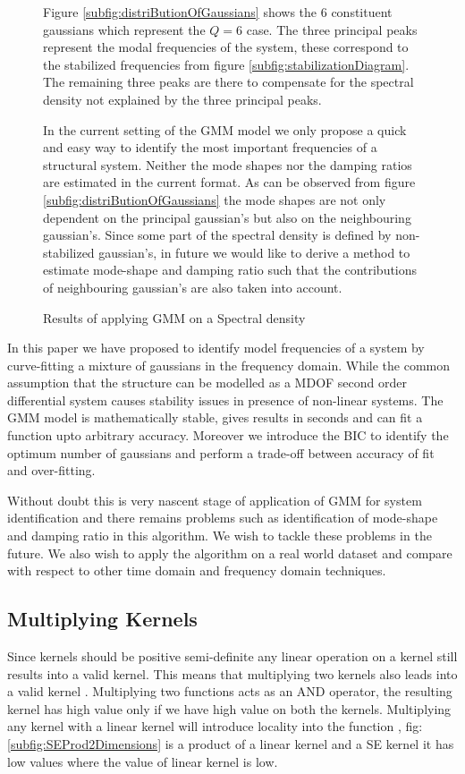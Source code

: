 \begin{figure}[!ht]
Figure \ref{subfig:distriButionOfGaussians} shows the $6$ constituent gaussians which represent the $Q=6$ case. The three principal peaks represent the modal frequencies of the system, these correspond to the stabilized frequencies from figure \ref{subfig:stabilizationDiagram}. The remaining three peaks are there to compensate for the spectral density not explained by the three principal peaks. 

In the current setting of the GMM model we only propose a quick and easy way to identify the most important frequencies of a structural system. Neither the mode shapes nor the damping ratios are estimated in the current format. As can be observed from figure \ref{subfig:distriButionOfGaussians} the mode shapes are not only dependent on the principal gaussian's but also on the neighbouring gaussian's. Since some part of the spectral density is defined by non-stabilized gaussian's, in future we would like to derive a method to estimate mode-shape and damping ratio such that the contributions of neighbouring gaussian's are also taken into account.
  
  \caption{Results of applying GMM on a Spectral density}
\end{figure}

In this paper we have proposed to identify model frequencies of a system by curve-fitting a mixture of gaussians in the frequency domain. While the common assumption that the structure can be modelled as a MDOF second order differential system causes stability issues in presence of non-linear systems. The GMM model is mathematically stable, gives results in seconds and can fit a function upto arbitrary accuracy. Moreover we introduce the BIC to identify the optimum number of gaussians and perform a trade-off between accuracy of fit and over-fitting. 

Without doubt this is very nascent stage of application of GMM for system identification and there remains problems such as identification of mode-shape and damping ratio in this algorithm. We wish to tackle these problems in the future. We also wish to apply the algorithm on a real world dataset and compare with respect to other time domain and frequency domain techniques.


\subsection{Multiplying Kernels} \label{subsec:structureKernelsMultiplyingKernels}
Since kernels should be positive semi-definite any linear operation on a kernel still results into a valid kernel. This means that multiplying two kernels also leads into a valid kernel \cite{bishop2006pattern} \cite{mackay2003information}. Multiplying two functions acts as an AND operator, the resulting kernel has high value only if we have high value on both the kernels. Multiplying any kernel with a linear kernel will introduce locality into the function , fig: \ref{subfig:SEProd2Dimensions} is a product of a linear kernel and a SE kernel it has low values where the value of linear kernel is low.

